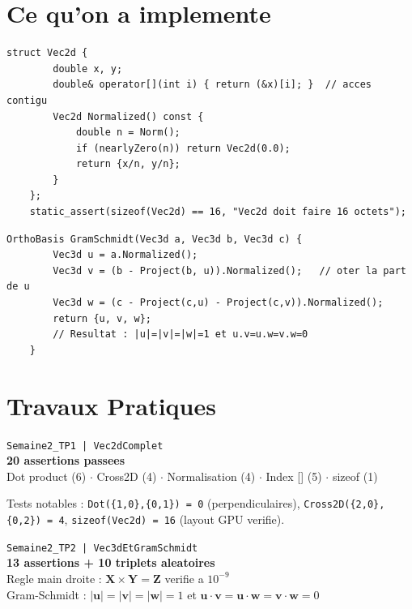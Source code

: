\documentclass[12pt,a4paper]{report}
\newcommand{\code}[1]{\texttt{\textcolor{PrimaryBlue}{#1}}}
\begin{document}
\section{Ce qu'on a implemente}

\begin{lstlisting}[caption={Vec2d : layout memoire garanti pour le GPU}]
    struct Vec2d {
        double x, y;
        double& operator[](int i) { return (&x)[i]; }  // acces contigu
        Vec2d Normalized() const {
            double n = Norm();
            if (nearlyZero(n)) return Vec2d(0.0);
            return {x/n, y/n};
        }
    };
    static_assert(sizeof(Vec2d) == 16, "Vec2d doit faire 16 octets");
\end{lstlisting}

\begin{lstlisting}[caption={Gram-Schmidt en 3 etapes}]
    OrthoBasis GramSchmidt(Vec3d a, Vec3d b, Vec3d c) {
        Vec3d u = a.Normalized();
        Vec3d v = (b - Project(b, u)).Normalized();   // oter la part de u
        Vec3d w = (c - Project(c,u) - Project(c,v)).Normalized();
        return {u, v, w};
        // Resultat : |u|=|v|=|w|=1 et u.v=u.w=v.w=0
    }
\end{lstlisting}

\section{Travaux Pratiques}

\begin{tpbox}
\begin{resultbox}
\centering
\texttt{Semaine2\_TP1 | Vec2dComplet}\\[4pt]
\textbf{20 assertions passees}\\[2pt]
Dot product (6) $\cdot$ Cross2D (4) $\cdot$ Normalisation (4) $\cdot$ Index [] (5) $\cdot$ sizeof (1)
\end{resultbox}
Tests notables : \code{Dot(\{1,0\},\{0,1\}) = 0} (perpendiculaires), \code{Cross2D(\{2,0\},\{0,2\}) = 4}, \code{sizeof(Vec2d) = 16} (layout GPU verifie).
\end{tpbox}

\begin{tpbox}
\begin{resultbox}
\centering
\texttt{Semaine2\_TP2 | Vec3dEtGramSchmidt}\\[4pt]
\textbf{13 assertions + 10 triplets aleatoires}\\[2pt]
Regle main droite : $\mathbf{X}\times\mathbf{Y}=\mathbf{Z}$ verifie a $10^{-9}$ \\
Gram-Schmidt : $|\mathbf{u}|=|\mathbf{v}|=|\mathbf{w}|=1$ et $\mathbf{u}\cdot\mathbf{v}=\mathbf{u}\cdot\mathbf{w}=\mathbf{v}\cdot\mathbf{w}=0$
\end{resultbox}
\end{tpbox}
\end{document}
